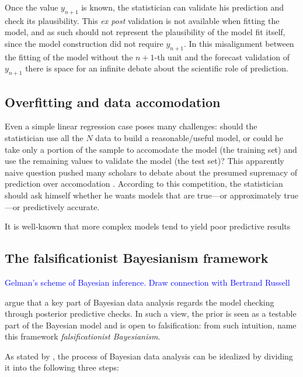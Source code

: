 \documentclass{statsoc}
\begin{document}
Once the value $y_{n+1}$ is known, the statistician can validate his prediction and check its plausibility. This \emph{ex post} validation is not available when fitting the model, and as such should not represent the plausibility of the model fit itself, since the model construction did not require $y_{n+1}$. In this misalignment between the fitting of the model without the $n+1$-th unit and the forecast validation of $y_{n+1}$ there is space for an infinite debate about the scientific role of prediction.




\subsection{Overfitting and data accomodation}

Even a simple linear regression case poses many challenges: should the statistician use all the $N$ data to build a reasonable/useful model, or could he take only a portion of the sample to accomodate the model (the training set) and use the remaining values to validate the model (the test set)? This apparently naive question pushed many scholars to debate about the presumed supremacy of prediction over accomodation \citep{maher1988prediction, hitchcock2004prediction, worrall2014prediction}. According to this competition, the statistician should ask himself whether he wants models that are true---or  approximately true---or predictively accurate. 

It is well-known that more complex models tend to yield poor predictive results



\subsection{The falsificationist Bayesianism framework}

\textcolor{blue}{Gelman's scheme of Bayesian inference. Draw connection with Bertrand Russell}

\cite{gelman2013philosophy} argue that a key part of Bayesian data analysis regards the model checking through posterior predictive checks. In such a view, the prior is seen as a testable part of the Bayesian model and is open to falsification: from such intuition, \cite{gelman2017beyond} name this framework \emph{falsificationist Bayesianism}.

As stated by \cite{gelman2013bayesian}, the process of Bayesian data analysis can be idealized by dividing it into the following three steps:
\end{document}

